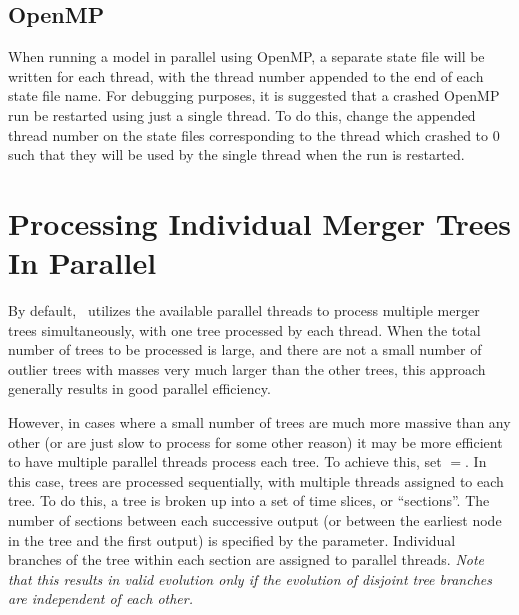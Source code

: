 \subsection{OpenMP}

When running a model in parallel using OpenMP, a separate state file will be written for each thread, with the thread number appended to the end of each state file name. For debugging purposes, it is suggested that a crashed OpenMP run be restarted using just a single thread. To do this, change the appended thread number on the state files corresponding to the thread which crashed to 0 such that they will be used by the single thread when the run is restarted.

\section{Processing Individual Merger Trees In Parallel}

By default, \glc\ utilizes the available parallel threads to process multiple merger trees simultaneously, with one tree processed by each thread. When the total number of trees to be processed is large, and there are not a small number of outlier trees with masses very much larger than the other trees, this approach generally results in good parallel efficiency.

However, in cases where a small number of trees are much more massive than any other (or are just slow to process for some other reason) it may be more efficient to have multiple parallel threads process each tree. To achieve this, set \mono{[treeEvolveSingleForest]}$=$. In this case, trees are processed sequentially, with multiple threads assigned to each tree. To do this, a tree is broken up into a set of time slices, or ``sections''. The number of sections between each successive output (or between the earliest node in the tree and the first output) is specified by the \mono{[treeEvolveSingleForestSections]} parameter. Individual branches of the tree within each section are assigned to parallel threads. \emph{Note that this results in valid evolution only if the evolution of disjoint tree branches are independent of each other.}
